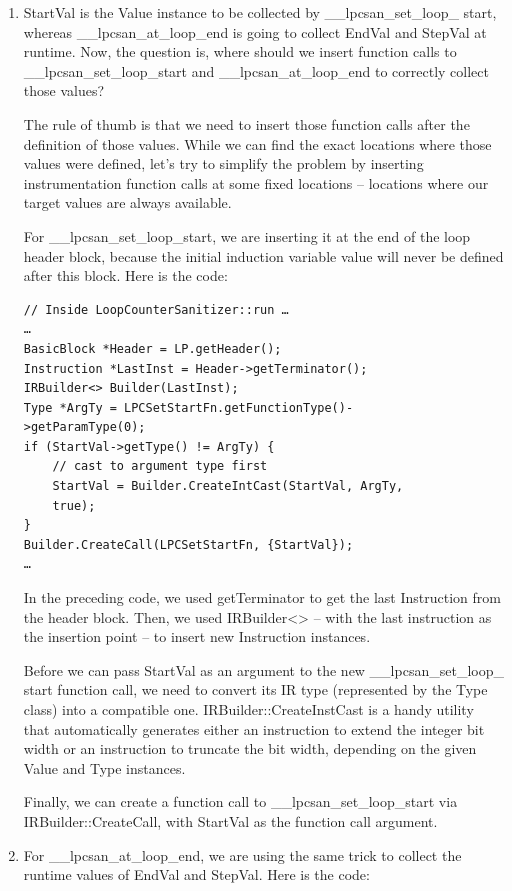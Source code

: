 \begin{enumerate}
\item StartVal is the Value instance to be collected by \_\_lpcsan\_set\_loop\_ start, whereas \_\_lpcsan\_at\_loop\_end is going to collect EndVal and StepVal at runtime. Now, the question is, where should we insert function calls to \_\_lpcsan\_set\_loop\_start and \_\_lpcsan\_at\_loop\_end to correctly collect those values?

The rule of thumb is that we need to insert those function calls after the definition of those values. While we can find the exact locations where those values were defined, let's try to simplify the problem by inserting instrumentation function calls at some fixed locations – locations where our target values are always available.

For \_\_lpcsan\_set\_loop\_start, we are inserting it at the end of the loop header block, because the initial induction variable value will never be defined after this block. Here is the code:

\begin{lstlisting}[style=styleCXX]
// Inside LoopCounterSanitizer::run …
…
BasicBlock *Header = LP.getHeader();
Instruction *LastInst = Header->getTerminator();
IRBuilder<> Builder(LastInst);
Type *ArgTy = LPCSetStartFn.getFunctionType()-
>getParamType(0);
if (StartVal->getType() != ArgTy) {
	// cast to argument type first
	StartVal = Builder.CreateIntCast(StartVal, ArgTy,
	true);
}
Builder.CreateCall(LPCSetStartFn, {StartVal});
…
\end{lstlisting}

In the preceding code, we used getTerminator to get the last Instruction from the header block. Then, we used IRBuilder<> – with the last instruction as the insertion point – to insert new Instruction instances.

Before we can pass StartVal as an argument to the new \_\_lpcsan\_set\_loop\_ start function call, we need to convert its IR type (represented by the Type class) into a compatible one. IRBuilder::CreateInstCast is a handy utility that automatically generates either an instruction to extend the integer bit width or an instruction to truncate the bit width, depending on the given Value and Type instances.

Finally, we can create a function call to \_\_lpcsan\_set\_loop\_start via IRBuilder::CreateCall, with StartVal as the function call argument.

\item For \_\_lpcsan\_at\_loop\_end, we are using the same trick to collect the runtime values of EndVal and StepVal. Here is the code:


\end{enumerate}
